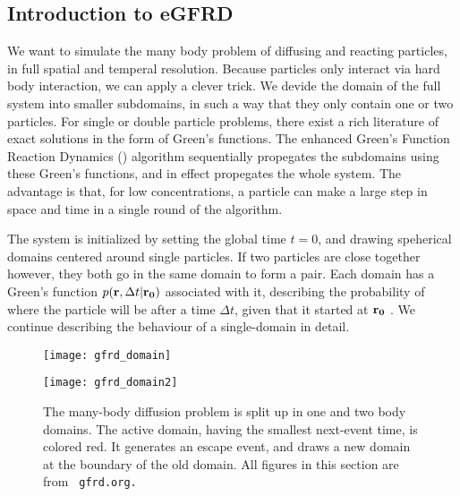 \subsection{Introduction to eGFRD}
We want to simulate the many body problem of diffusing and reacting particles, in full spatial and temperal resolution. Because particles only interact via hard body interaction, we can apply a clever trick. We devide the domain of the full system into smaller subdomains, in such a way that they only contain one or two particles. For single or double particle problems, there exist a rich literature of exact solutions in the form of Green's functions. The enhanced Green's Function Reaction Dynamics (\GFRD) algorithm sequentially propegates the subdomains using these Green's functions, and in effect propegates the whole system. \cite{VanZon2006}\cite{VanZon2005}\cite{Takahashi2010} The advantage is that, for low concentrations, a particle can make a large step in space and time in a single round of the algorithm.

The system is initialized by setting the global time $t=0$, and drawing speherical domains centered around single particles. If two particles are close together however, they both go in the same domain to form a pair.  Each domain has a Green's function $p({\bf r}, \Delta t|{\bf r_0})$ associated with it, describing the probability of where the particle will be after a time $\Delta t$, given that it started at ${\bf r_0}$ \cite{Carslaw1959}. We continue describing the behaviour of a single-domain in detail.

\begin{figure}[ht]
\begin{minipage}[ht]{.5\linewidth}
\centering
\texttt{[image: gfrd\_domain]}
\end{minipage}
\begin{minipage}[ht]{.5\linewidth}
\centering
\texttt{[image: gfrd\_domain2]}
\end{minipage}
\caption{ The many-body diffusion problem is split up in one and two body domains. The active domain, having the smallest next-event time, is colored red. It generates an escape event, and draws a new domain at the boundary of the old domain. All figures in this section are from \tt{ gfrd.org}.}
\end{figure}

